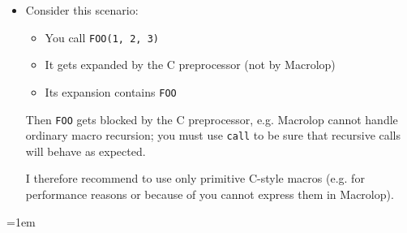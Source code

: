 \documentclass[12pt]{article}
\theoremstyle{break}
\begin{document}
\begin{itemize}
\item Consider this scenario:
    \begin{itemize}
        \item You call \texttt{FOO(1, 2, 3)}
        \item It gets expanded by the C preprocessor (not by Macrolop)
        \item Its expansion contains \texttt{FOO}
    \end{itemize}
Then \texttt{FOO} gets blocked by the C preprocessor, e.g. Macrolop cannot handle ordinary
macro recursion; you must use \texttt{call} to be sure that recursive calls
will behave as expected.

I therefore recommend to use only primitive C-style macros (e.g. for performance
reasons or because of you cannot express them in Macrolop).
\end{itemize}

\emergencystretch=1em
\printbibliography
\end{document}
